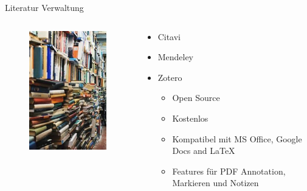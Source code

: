 \documentclass[aspectratio=169,shownotes]{beamer}
\begin{document}
\begin{frame}{Literatur Verwaltung}
    \begin{columns}[t]
        \begin{column}{0.29\textwidth}
            \vspace*{-0.1\textheight}
            \begin{figure}[t]
                \includegraphics[height=0.8\textheight]{graphics/LiteraturChaos.jpeg}         
            \end{figure}
        \end{column}        
        \begin{column}{0.69\textwidth}
            \begin{itemize}
                \item Citavi
                \item Mendeley
                \item Zotero
                \pause
                \begin{itemize}
                    \item Open Source
                    \item Kostenlos
                    \item Kompatibel mit MS Office, Google Docs and LaTeX
                    \item Features für PDF Annotation, Markieren und Notizen
                \end{itemize}
            \end{itemize}           
        \end{column}        
    \end{columns}    
\end{frame}
\end{document}
